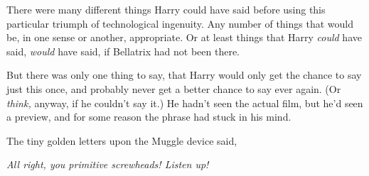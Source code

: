 There were many different things Harry could have said before using this particular triumph of technological ingenuity. Any number of things that would be, in one sense or another, appropriate. Or at least things that Harry \emph{could} have said, \emph{would} have said, if Bellatrix had not been there.

But there was only one thing to say, that Harry would only get the chance to say just this once, and probably never get a better chance to say ever again. (Or \emph{think,} anyway, if he couldn’t say it.) He hadn’t seen the actual film, but he’d seen a preview, and for some reason the phrase had stuck in his mind.

The tiny golden letters upon the Muggle device said,

\emph{All right, you primitive screwheads! Listen up!}

